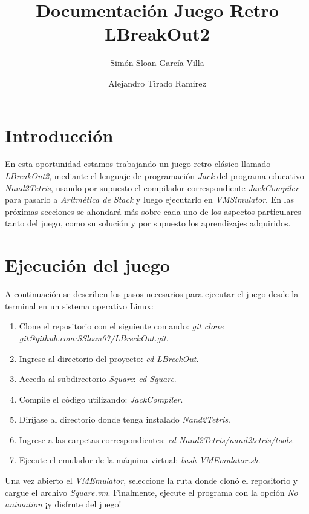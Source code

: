 \documentclass[twocolumn]{article}
\title{Documentación Juego Retro LBreakOut2}
\author{Simón Sloan García Villa \and Alejandro Tirado Ramirez}
\begin{document}
	\maketitle
	\tableofcontents
	
	\section{Introducción}
	En esta oportunidad estamos trabajando un juego retro clásico llamado \emph{LBreakOut2}, mediante el lenguaje de programación \emph{Jack} del programa educativo \emph{Nand2Tetris}, usando por supuesto el compilador correspondiente \emph{JackCompiler} para pasarlo a \emph{Aritmética de Stack} y luego ejecutarlo en \emph{VMSimulator}. En las próximas secciones se ahondará más sobre cada uno de los aspectos particulares tanto del juego, como su solución y por supuesto los aprendizajes adquiridos.
	\section{Ejecución del juego}
	A continuación se describen los pasos necesarios para ejecutar el juego desde la terminal en un sistema operativo Linux:
	
	\begin{enumerate}
		\item Clone el repositorio con el siguiente comando: \emph{git clone git@github.com:SSloan07/LBreckOut.git}.
		\item Ingrese al directorio del proyecto: \emph{cd LBreckOut}.
		\item Acceda al subdirectorio \emph{Square}: \emph{cd Square}.
		\item Compile el código utilizando: \emph{JackCompiler}.
		\item Diríjase al directorio donde tenga instalado \emph{Nand2Tetris}.
		\item Ingrese a las carpetas correspondientes: \emph{cd Nand2Tetris/nand2tetris/tools}.
		\item Ejecute el emulador de la máquina virtual: \emph{bash VMEmulator.sh}.
	\end{enumerate}
	
	Una vez abierto el \emph{VMEmulator}, seleccione la ruta donde clonó el repositorio y cargue el archivo \emph{Square.vm}.  
	Finalmente, ejecute el programa con la opción \emph{No animation} ¡y disfrute del juego!
	
\end{document}
